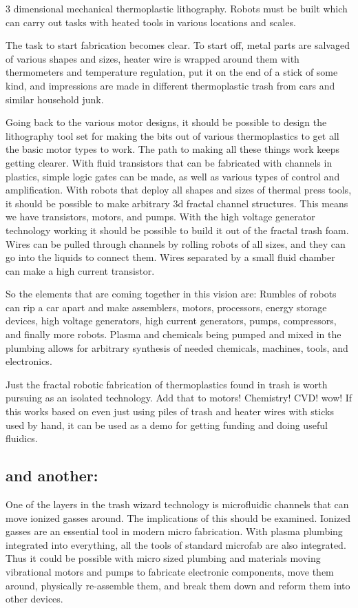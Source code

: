 3 dimensional mechanical thermoplastic lithography. Robots must be built
which can carry out tasks with heated tools in various locations and
scales.

The task to start fabrication becomes clear. To start off, metal parts
are salvaged of various shapes and sizes, heater wire is wrapped around
them with thermometers and temperature regulation, put it on the end of
a stick of some kind, and impressions are made in different
thermoplastic trash from cars and similar household junk.

Going back to the various motor designs, it should be possible to design
the lithography tool set for making the bits out of various
thermoplastics to get all the basic motor types to work. The path to
making all these things work keeps getting clearer. With fluid
transistors that can be fabricated with channels in plastics, simple
logic gates can be made, as well as various types of control and
amplification. With robots that deploy all shapes and sizes of thermal
press tools, it should be possible to make arbitrary 3d fractal channel
structures. This means we have transistors, motors, and pumps. With the
high voltage generator technology working it should be possible to build
it out of the fractal trash foam. Wires can be pulled through channels
by rolling robots of all sizes, and they can go into the liquids to
connect them. Wires separated by a small fluid chamber can make a high
current transistor.

So the elements that are coming together in this vision are: Rumbles of
robots can rip a car apart and make assemblers, motors, processors,
energy storage devices, high voltage generators, high current
generators, pumps, compressors, and finally more robots. Plasma and
chemicals being pumped and mixed in the plumbing allows for arbitrary
synthesis of needed chemicals, machines, tools, and electronics.

Just the fractal robotic fabrication of thermoplastics found in trash is
worth pursuing as an isolated technology. Add that to motors! Chemistry!
CVD! wow! If this works based on even just using piles of trash and
heater wires with sticks used by hand, it can be used as a demo for
getting funding and doing useful fluidics.

\subsection{and another:}\label{and-another}

One of the layers in the trash wizard technology is microfluidic
channels that can move ionized gasses around. The implications of this
should be examined. Ionized gasses are an essential tool in modern micro
fabrication. With plasma plumbing integrated into everything, all the
tools of standard microfab are also integrated. Thus it could be
possible with micro sized plumbing and materials moving vibrational
motors and pumps to fabricate electronic components, move them around,
physically re-assemble them, and break them down and reform them into
other devices.

